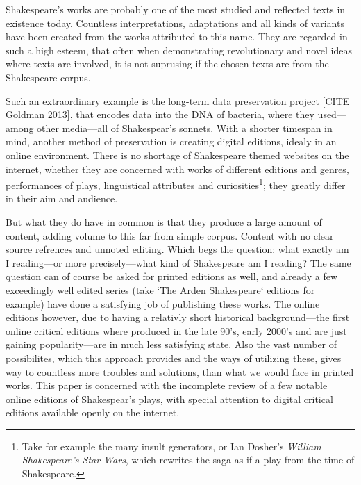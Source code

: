 \documentclass{article}
\begin{document}
Shakespeare's works are probably one of the most studied and reflected texts in existence today. Countless interpretations, adaptations and all kinds of variants have been created from the works attributed to this name. They are regarded in such a high esteem, that often when demonstrating revolutionary and novel ideas where texts are involved, it is not suprusing if the chosen texts are from the Shakespeare corpus. 

Such an extraordinary example is the long-term data preservation project [CITE Goldman 2013], that encodes data into the DNA of bacteria, where they used---among other media---all of Shakespear's sonnets. With a shorter timespan in mind, another method of preservation is creating digital editions, idealy in an online environment. There is no shortage of Shakespeare themed websites on the internet, whether they are concerned with works of different editions and genres, performances of plays, linguistical attributes and curiosities\footnote{Take for example the many insult generators, or Ian Dosher's \textit{William Shakespeare's Star Wars}, which rewrites the saga as if a play from the time of Shakespeare.}; they greatly differ in their aim and audience. 

But what they do have in common is that they produce a large amount of content, adding volume to this far from simple corpus. Content with no clear source refrences and unnoted editing. Which begs the question: what exactly am I reading---or more precisely---what kind of Shakespeare am I reading? The same question can of course be asked for printed editions as well, and already a few exceedingly well edited series (take `The Arden Shakespeare` editions for example) have done a satisfying job of publishing these works. The online editions however, due to having a relativly short historical background---the first online critical editions where produced in the late 90's, early 2000's and are just gaining popularity---are in much less satisfying state. Also the vast number of possibilites, which this approach provides and the ways of utilizing these, gives way to countless more troubles and solutions, than what we would face in printed works. This paper is concerned with the incomplete review of a few notable online editions of Shakespear's plays, with special attention to digital critical editions available openly on the internet.
\end{document}
